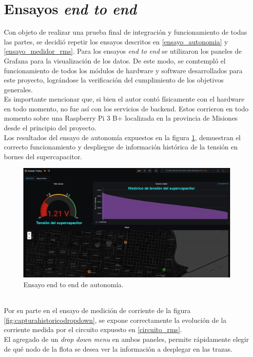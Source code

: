 \section{Ensayos \textit{end to end}}
Con objeto de realizar una prueba final de integraci\'{o}n y funcionamiento de todas las partes, se decidi\'{o} repetir los ensayos descritos en \ref{ensayo_autonomia} y \ref{ensayo_medidor_rms}. Para los ensayos \textit{end to end} se utilizaron los paneles de Grafana para la visualización de los datos. De este modo, se comtempló el funcionamiento de todos los módulos de hardware y software desarrollados para este proyecto, lográndose la verificación del cumplimiento de los objetivos generales.\\
Es importante mencionar que, si bien el autor cont\'{o} físicamente con el hardware en todo momento, no fue as\'{i} con los servicios de backend. Estos corrieron en todo momento sobre una Raspberry Pi 3 B+ localizada en la provincia de Misiones desde el principio del proyecto.\\
Los resultados del ensayo de autonomía expuestos en la figura \ref{fig:e2esupercap}, demuestran el correcto funcionamiento y despliegue de informaci\'{o}n hist\'{o}rica de la tensión en bornes del supercapacitor.\\
\begin{figure}[h]
	\centering
	\includegraphics[width=1.0\linewidth]{Figures/e2e_supercap}
	\caption{Ensayo end to end de autonom\'{i}a.}
	\label{fig:e2esupercap}
\end{figure}\\
Por su parte en el ensayo de medici\'{o}n de corriente de la figura \ref{fig:capturahistoricodropdown}, se expone correctamente la evoluci\'{o}n de la corriente medida por el circuito expuesto en \ref{circuito_rms}.\\
El agregado de un \textit{drop down menu} en ambos paneles, permite rápidamente elegir de qu\'{e} nodo de la flota se desea ver la informaci\'{o}n a desplegar en las trazas.\\
